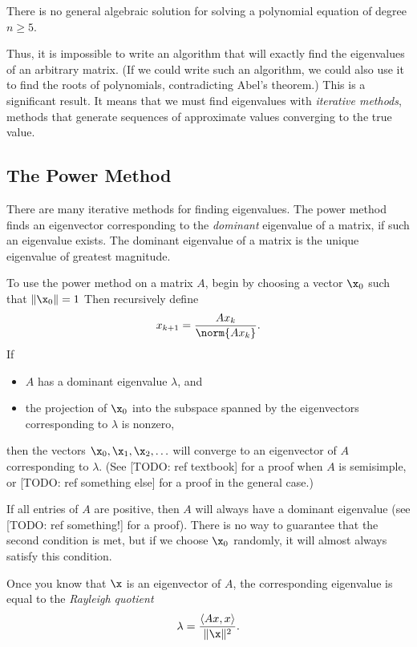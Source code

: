\begin{theorem}
There is no general algebraic solution for solving a polynomial equation of degree $n\geq5$.
\label{thm:Abel}
\end{theorem}

Thus, it is impossible to write an algorithm that will exactly find the eigenvalues of an arbitrary matrix.
(If we could write such an algorithm, we could also use it to find the roots of polynomials, contradicting Abel's theorem.)
This is a significant result.
It means that we must find eigenvalues with \emph{iterative methods}, methods that generate sequences of approximate values converging to the true value.

\subsection*{The Power Method} %

There are many iterative methods for finding eigenvalues.
The power method finds an eigenvector corresponding to the \emph{dominant} eigenvalue of a matrix, if such an eigenvalue exists.
The dominant eigenvalue of a matrix is the unique eigenvalue of greatest magnitude.

To use the power method on a matrix $A$, begin by choosing a vector $\x_0$ such that $\|\x_0\|=1$
Then recursively define
\[
x_{k+1}=\frac{Ax_k}{\norm{Ax_k}}.
\]
If
\begin{itemize}
\item $A$ has a dominant eigenvalue $\lambda$, and
\item the projection of $\x_0$ into the subspace spanned by the eigenvectors corresponding to $\lambda$ is nonzero,
\end{itemize}
then the vectors $\x_0, \x_1, \x_2, \ldots$ will converge to an eigenvector of $A$ corresponding to $\lambda$.
(See [TODO: ref textbook] for a proof when $A$ is semisimple, or [TODO: ref something else] for a proof in the general case.)

If all entries of $A$ are positive, then $A$ will always have a dominant eigenvalue (see [TODO: ref something!] for a proof).
There is no way to guarantee that the second condition is met, but if we choose $\x_0$ randomly, it will almost always satisfy this condition.

Once you know that $\x$ is an eigenvector of $A$, the corresponding eigenvalue is equal to the \emph{Rayleigh quotient}
\[
\lambda = \frac{\langle Ax, x \rangle}{\|\x\|^2}.
\]

